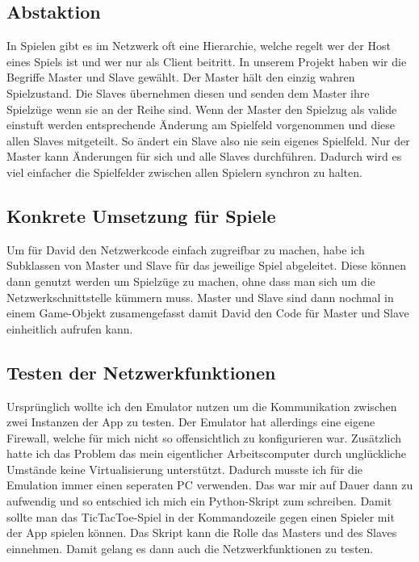 \subsection{Abstaktion}
In Spielen gibt es im Netzwerk oft eine Hierarchie, welche regelt wer der Host eines Spiels ist und wer nur als Client beitritt.
In unserem Projekt haben wir die Begriffe Master und Slave gewählt.
Der Master hält den einzig wahren Spielzustand. Die Slaves übernehmen diesen und senden dem Master ihre Spielzüge wenn
sie an der Reihe sind. Wenn der Master den Spielzug als valide einstuft werden entsprechende Änderung
am Spielfeld vorgenommen und diese allen Slaves mitgeteilt.
So ändert ein Slave also nie sein eigenes Spielfeld. Nur der Master kann Änderungen für sich und alle Slaves durchführen.
Dadurch wird es viel einfacher die Spielfelder zwischen allen Spielern synchron zu halten.
\subsection{Konkrete Umsetzung für Spiele}
Um für David den Netzwerkcode einfach zugreifbar zu machen, habe ich Subklassen von Master und Slave für das jeweilige Spiel abgeleitet.
Diese können dann genutzt werden um Spielzüge zu machen, ohne dass man sich um die Netzwerkschnittstelle kümmern muss.
Master und Slave sind dann nochmal in einem Game-Objekt zusamengefasst damit David den Code für Master und Slave
einheitlich aufrufen kann.
\subsection{Testen der Netzwerkfunktionen}
Ursprünglich wollte ich den Emulator nutzen um die Kommunikation zwischen zwei Instanzen der App zu testen.
Der Emulator hat allerdings eine eigene Firewall, welche für mich nicht so offensichtlich zu konfigurieren war.
Zusätzlich hatte ich das Problem das mein eigentlicher Arbeitscomputer durch unglückliche Umstände keine Virtualisierung unterstützt.
Dadurch musste ich für die Emulation immer einen seperaten PC verwenden. Das war mir auf Dauer dann zu aufwendig und so entschied ich mich
ein Python-Skript zum schreiben. Damit sollte man das TicTacToe-Spiel in der Kommandozeile gegen einen Spieler mit der App spielen können.
Das Skript kann die Rolle das Masters und des Slaves einnehmen. Damit gelang es dann auch die Netzwerkfunktionen zu testen.
